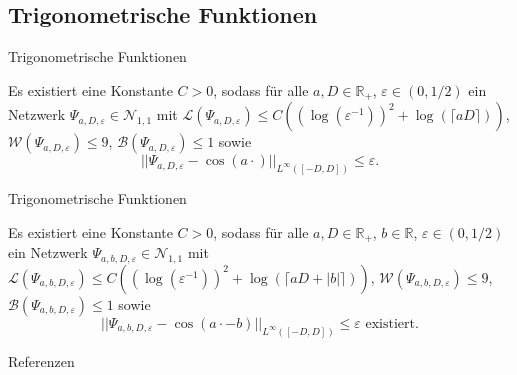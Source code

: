 \documentclass[10pt,aspectratio=169]{beamer}
\newcommand{\R}{\mathbb{R}} %
\begin{document}
\subsection{Trigonometrische Funktionen}

\begin{frame}{Trigonometrische Funktionen}
    \begin{theorem} %
        \newcommand{\Psia}{\Psi_{a,D,\varepsilon}}
        Es existiert eine Konstante \(C>0\), sodass für alle \(a,D\in \R_+\), \(\varepsilon \in (0,1/2)\) 
        ein Netzwerk \(\Psia \in \mathcal{N}_{1,1}\) mit \(\mathcal{L}(\Psia) \leq C((\log(\varepsilon^{-1}))^2 + \log(\lceil aD\rceil))\), 
        \(\mathcal{W}(\Psia) \leq 9\), \(\mathcal{B}(\Psia) \leq 1\) sowie 
        \[ ||\Psia - \cos(a \cdot) ||_{L^{\infty}([-D,D])} \leq \varepsilon. \]
    \end{theorem}
\end{frame}

\begin{frame}{Trigonometrische Funktionen}
    \begin{corollary} %
        \newcommand{\Psia}{\Psi_{a,b,D,\varepsilon}}
        Es existiert eine Konstante \(C>0\), sodass für alle \(a,D\in \R_+\), \(b\in \R\), \(\varepsilon \in (0,1/2)\) 
        ein Netzwerk \(\Psia \in \mathcal{N}_{1,1} \) mit 
        \(\mathcal{L}(\Psia) \leq C((\log(\varepsilon^{-1}))^2 + \log(\lceil a D + |b| \rceil))\), 
        \(\mathcal{W}(\Psia) \leq 9\), \(\mathcal{B}(\Psia) \leq 1\) sowie 
        \[ ||\Psia - \cos(a \cdot - b) ||_{L^\infty([-D,D])} \leq \varepsilon \text{ existiert}. \]
    \end{corollary}
\end{frame}

\begin{frame}{Referenzen}
    \footnotesize
    \nocite{Grohs2019}
    \printbibliography[heading=none]
\end{frame}
\end{document}
